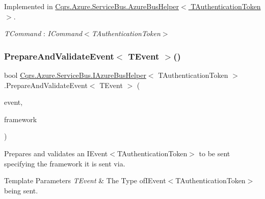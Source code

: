 Implemented in \hyperlink{classCqrs_1_1Azure_1_1ServiceBus_1_1AzureBusHelper_a4d03f55a58a018fbbf6fd518ad9b24f8_a4d03f55a58a018fbbf6fd518ad9b24f8}{Cqrs.\+Azure.\+Service\+Bus.\+Azure\+Bus\+Helper$<$ T\+Authentication\+Token $>$}.

\begin{Desc}
\item[Type Constraints]\begin{description}
\item[{\em T\+Command} : {\em I\+Command$<$T\+Authentication\+Token$>$}]\end{description}
\end{Desc}
\mbox{\label{interfaceCqrs_1_1Azure_1_1ServiceBus_1_1IAzureBusHelper_ac5cbeb6e8bbdb1a98501f0b746c12abd_ac5cbeb6e8bbdb1a98501f0b746c12abd}} 
\subsubsection{\texorpdfstring{Prepare\+And\+Validate\+Event$<$ T\+Event $>$()}{PrepareAndValidateEvent< TEvent >()}}
{\footnotesize\ttfamily bool \hyperlink{interfaceCqrs_1_1Azure_1_1ServiceBus_1_1IAzureBusHelper}{Cqrs.\+Azure.\+Service\+Bus.\+I\+Azure\+Bus\+Helper}$<$ T\+Authentication\+Token $>$.Prepare\+And\+Validate\+Event$<$ T\+Event $>$ (\begin{DoxyParamCaption}\item[{T\+Event @}]{event,  }\item[{string}]{framework }\end{DoxyParamCaption})}



Prepares and validates an I\+Event$<$\+T\+Authentication\+Token$>$ to be sent specifying the framework it is sent via. 


\begin{DoxyTemplParams}{Template Parameters}
{\em T\+Event} & The Type ofI\+Event$<$\+T\+Authentication\+Token$>$ being sent.\\
\hline
\end{DoxyTemplParams}

